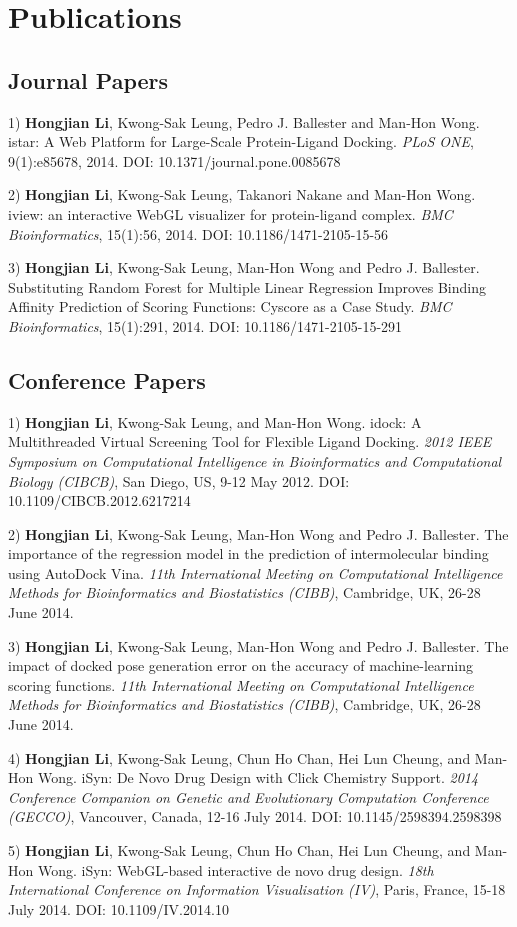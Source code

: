 \chapter{Publications}

\section{Journal Papers}

1) \textbf{Hongjian Li}, Kwong-Sak Leung, Pedro J. Ballester and Man-Hon Wong. istar: A Web Platform for Large-Scale Protein-Ligand Docking. \textit{PLoS ONE}, 9(1):e85678, 2014. DOI: 10.1371/journal.pone.0085678

2) \textbf{Hongjian Li}, Kwong-Sak Leung, Takanori Nakane and Man-Hon Wong. iview: an interactive WebGL visualizer for protein-ligand complex. \textit{BMC Bioinformatics}, 15(1):56, 2014. DOI: 10.1186/1471-2105-15-56

3) \textbf{Hongjian Li}, Kwong-Sak Leung, Man-Hon Wong and Pedro J. Ballester. Substituting Random Forest for Multiple Linear Regression Improves Binding Affinity Prediction of Scoring Functions: Cyscore as a Case Study. \textit{BMC Bioinformatics}, 15(1):291, 2014. DOI: 10.1186/1471-2105-15-291

\section{Conference Papers}

1) \textbf{Hongjian Li}, Kwong-Sak Leung, and Man-Hon Wong. idock: A Multithreaded Virtual Screening Tool for Flexible Ligand Docking. \textit{2012 IEEE Symposium on Computational Intelligence in Bioinformatics and Computational Biology (CIBCB)}, San Diego, US, 9-12 May 2012. DOI: 10.1109/CIBCB.2012.6217214

2) \textbf{Hongjian Li}, Kwong-Sak Leung, Man-Hon Wong and Pedro J. Ballester. The importance of the regression model in the prediction of intermolecular binding using AutoDock Vina. \textit{11th International Meeting on Computational Intelligence Methods for Bioinformatics and Biostatistics (CIBB)}, Cambridge, UK, 26-28 June 2014.

3) \textbf{Hongjian Li}, Kwong-Sak Leung, Man-Hon Wong and Pedro J. Ballester. The impact of docked pose generation error on the accuracy of machine-learning scoring functions. \textit{11th International Meeting on Computational Intelligence Methods for Bioinformatics and Biostatistics (CIBB)}, Cambridge, UK, 26-28 June 2014.

4) \textbf{Hongjian Li}, Kwong-Sak Leung, Chun Ho Chan, Hei Lun Cheung, and Man-Hon Wong. iSyn: De Novo Drug Design with Click Chemistry Support. \textit{2014 Conference Companion on Genetic and Evolutionary Computation Conference (GECCO)}, Vancouver, Canada, 12-16 July 2014. DOI: 10.1145/2598394.2598398

5) \textbf{Hongjian Li}, Kwong-Sak Leung, Chun Ho Chan, Hei Lun Cheung, and Man-Hon Wong. iSyn: WebGL-based interactive de novo drug design. \textit{18th International Conference on Information Visualisation (IV)}, Paris, France, 15-18 July 2014. DOI: 10.1109/IV.2014.10

\chapterend
